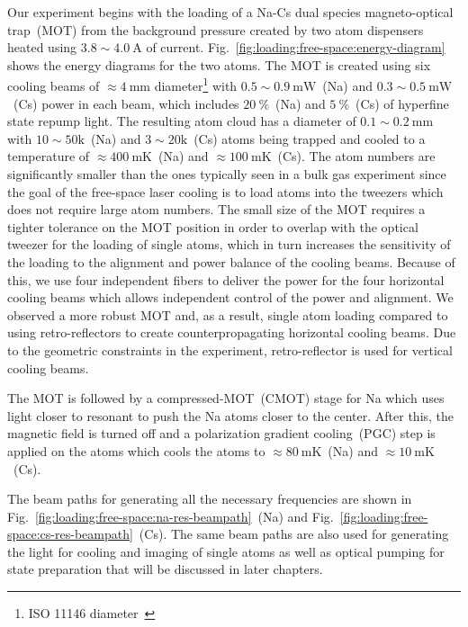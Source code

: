 Our experiment begins with the loading of a Na-Cs dual species magneto-optical trap~(MOT)
from the background pressure created by two atom dispensers
heated using $3.8\sim4.0~\mathrm{A}$ of current.
Fig.~\ref{fig:loading:free-space:energy-diagram} shows the energy diagrams for the two atoms.
The MOT is created using six cooling beams of $\approx\!4~\mathrm{mm}$ diameter\footnote{
  ISO 11146 diameter~\cite{isotc_172sc_9_iso_2005,dataray_inc_wincamd_2018}}
with $0.5\sim0.9~\mathrm{mW}$~(Na) and $0.3\sim0.5~\mathrm{mW}$~(Cs)
power in each beam, which includes $20~\mathrm{\%}$~(Na)
and $5~\mathrm{\%}$~(Cs) of hyperfine state repump light.
The resulting atom cloud has a diameter of $0.1\sim0.2~\mathrm{mm}$
with $10\sim50\mathrm{k}$~(Na) and $3\sim20\mathrm{k}$~(Cs) atoms being trapped
and cooled to a temperature of $\approx\!400~\mathrm{mK}$~(Na)
and $\approx\!100~\mathrm{mK}$~(Cs).
The atom numbers are significantly smaller than the ones typically seen in a bulk gas experiment
since the goal of the free-space laser cooling is to load atoms into the tweezers
which does not require large atom numbers.
The small size of the MOT requires a tighter tolerance on the MOT position
in order to overlap with the optical tweezer for the loading of single atoms,
which in turn increases the sensitivity of the loading to the alignment
and power balance of the cooling beams.
Because of this, we use four independent fibers to deliver the power
for the four horizontal cooling beams which allows independent control
of the power and alignment.
We observed a more robust MOT and, as a result, single atom loading
compared to using retro-reflectors to create counterpropagating horizontal cooling beams.
Due to the geometric constraints in the experiment,
retro-reflector is used for vertical cooling beams.

The MOT is followed by a compressed-MOT~(CMOT) stage for Na
which uses light closer to resonant to push the Na atoms closer to the center.
After this, the magnetic field is turned off and
a polarization gradient cooling~(PGC) step is applied on the atoms
which cools the atoms to $\approx\!80~\mathrm{mK}$~(Na)
and $\approx\!10~\mathrm{mK}$~(Cs).

The beam paths for generating all the necessary frequencies are shown in
Fig.~\ref{fig:loading:free-space:na-res-beampath}~(Na) and
Fig.~\ref{fig:loading:free-space:cs-res-beampath}~(Cs).
The same beam paths are also used for generating the light for cooling
and imaging of single atoms as well as optical pumping for state preparation
that will be discussed in later chapters.

